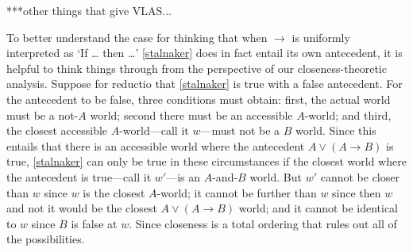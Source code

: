 \documentclass[If.tex]{subfiles}
\begin{document}
***other things that give VLAS...



To better understand the case for thinking that when $→$ is uniformly interpreted as ‘If … then …’ \ref{stalnaker} does in fact entail its own antecedent, it is helpful to think things through from the perspective of our closeness-theoretic analysis.  Suppose for reductio that \ref{stalnaker} is true with a false antecedent.  For the antecedent to be false, three conditions must obtain: first, the actual world must be a not-$A$ world; second there must be an accessible $A$-world; and third, the closest accessible $A$-world---call it $w$---must not be a $B$ world.  Since this entails that there is an accessible world where the antecedent $A ∨ (A → B)$ is true, \ref{stalnaker} can only be true in these circumstances if the closest world where the antecedent is true---call it $w'$---is an $A$-and-$B$ world.  But $w'$ cannot be closer than $w$ since $w$ is the closest $A$-world; it cannot be further than $w$ since then $w$ and not it would be the closest $A ∨ (A → B)$ world; and it cannot be identical to $w$ since $B$ is false at $w$.  Since closeness is a total ordering that rules out all of the possibilities.
\end{document}
